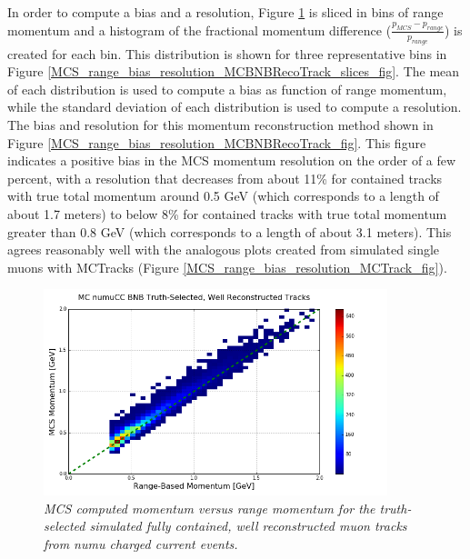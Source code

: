 In order to compute a bias and a resolution, Figure \ref{MCS_range_momentum_MCBNBRecoTrack_fig} is sliced in bins of range momentum and a histogram of the fractional momentum difference ($\frac{p_{MCS} - p_{range}}{p_{range}}$) is created for each bin. This distribution is shown for three representative bins in Figure \ref{MCS_range_bias_resolution_MCBNBRecoTrack_slices_fig}. The mean of each distribution is used to compute a bias as function of range momentum, while the standard deviation of each distribution is used to compute a resolution. The bias and resolution for this momentum reconstruction method shown in Figure \ref{MCS_range_bias_resolution_MCBNBRecoTrack_fig}. This figure indicates a positive bias in the MCS momentum resolution on the order of a few percent, with a resolution that decreases from about 11\% for contained tracks with true total momentum around 0.5 GeV (which corresponds to a length of about 1.7 meters) to below 8\% for contained tracks with true total momentum greater than 0.8 GeV (which corresponds to a length of about 3.1 meters). This agrees reasonably well with the analogous plots created from simulated single muons with {\sc MCTracks} (Figure \ref{MCS_range_bias_resolution_MCTrack_fig}).


\begin{figure}[ht!]
\begin{center}
\includegraphics[width=100mm]{Figures/MCS_range_comparison_MCBNBRecoTrack.png}
\end{center}
\caption{\textit{MCS computed momentum versus range momentum for the truth-selected simulated fully contained, well reconstructed muon tracks from numu charged current events.}}
\label{MCS_range_momentum_MCBNBRecoTrack_fig}
\end{figure}


